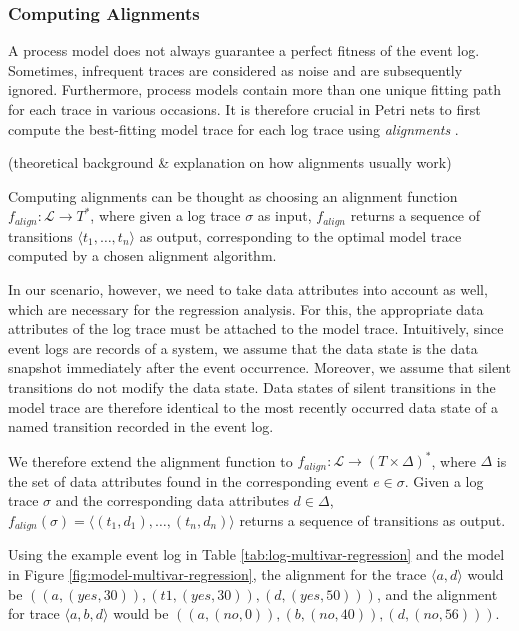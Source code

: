 \subsubsection*{Computing Alignments}

A process model does not always guarantee a perfect fitness of the event log. Sometimes, infrequent traces are considered as noise and are subsequently ignored. Furthermore, process models contain more than one unique fitting path for each trace in various occasions. It is therefore crucial in Petri nets to first compute the best-fitting model trace for each log trace using \emph{alignments} \cite{alignments}.

(theoretical background \& explanation on how alignments usually work)

Computing alignments can be thought as choosing an alignment function $f_{align} \colon \mathcal{L} \rightarrow T^*$, where given a log trace $\sigma$ as input, $f_{align}$ returns a sequence of transitions $\langle t_1, \dots, t_n \rangle$ as output, corresponding to the optimal model trace computed by a chosen alignment algorithm.

In our scenario, however, we need to take data attributes into account as well, which are necessary for the regression analysis. For this, the appropriate data attributes of the log trace must be attached to the model trace. Intuitively, since event logs are records of a system, we assume that the data state is the data snapshot immediately after the event occurrence. Moreover, we assume that silent transitions do not modify the data state. Data states of silent transitions in the model trace are therefore identical to the most recently occurred data state of a named transition recorded in the event log.

We therefore extend the alignment function to $f_{align} \colon \mathcal{L} \rightarrow (T \times \Delta)^*$, where $\Delta$ is the set of data attributes found in the corresponding event $e \in \sigma$. Given a log trace $\sigma$ and the corresponding data attributes $d \in \Delta$, $f_{align}(\sigma) = \langle (t_1, d_1), \dots, (t_n, d_n) \rangle$ returns a sequence of transitions as output.

Using the example event log in Table \ref{tab:log-multivar-regression} and the model in Figure \ref{fig:model-multivar-regression}, the alignment for the trace $\langle a, d \rangle$ would be $((a, (yes, 30)), (t1, (yes, 30)), (d, (yes, 50)))$, and the alignment for trace $\langle a, b, d \rangle$ would be $((a, (no, 0)), (b, (no, 40)), (d, (no, 56)))$.

